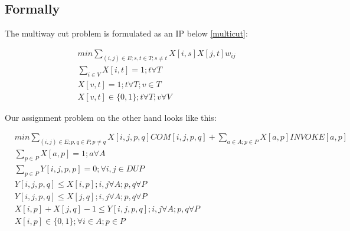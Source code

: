 \subsection*{Formally}

The multiway cut problem is formulated as an IP below \eqref{multicut}:

\begin{equation}\label{multicut}
\begin{split}
& min \sum_{(i,j) \in E; s, t \in T; s \neq t}{X[i,s] X[j,t] w_{ij}} \\
& \sum_{i \in V}{X[i,t]} = 1; t \forall T \\
& X[v,t] = 1; t \forall T ; v \in T \\
& X[v,t] \in \{0,1\};  t \forall T ; v \forall V
\end{split}
\end{equation}

Our assignment problem on the other hand looks like this:

\begin{equation}\label{assignment}
\begin{split}
& min \sum_{(i,j) \in E; p, q \in P; p \neq q}{X[i,j,p,q] COM[i,j,p,q]} + \sum_{a \in A; p \in P}{X[a,p] INVOKE[a,p]}\\
& \sum_{p \in P}{X[a,p]} = 1; a \forall A \\
& \sum_{p \in P}{Y[i,j,p,p]} = 0; \forall i,j \in DUP \\
& Y[i,j,p,q] \leq X[i,p]; i,j \forall A; p,q \forall P \\
& Y[i,j,p,q] \leq X[j,q]; i,j \forall A; p,q \forall P \\
& X[i,p] + X[j,q] - 1 \leq Y[i,j,p,q]; i,j \forall A; p,q \forall P \\
& X[i,p] \in \{0,1\};  \forall i \in A; p \in P
\end{split}
\end{equation}